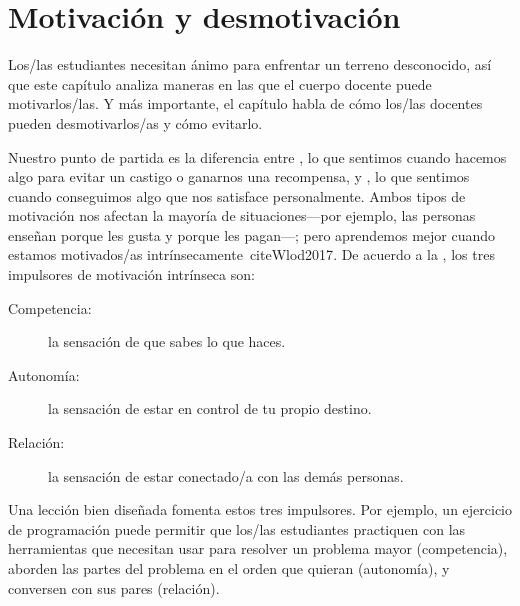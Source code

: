 \chapter{Motivación y desmotivación}\label{s:motivation}

Los/las estudiantes necesitan ánimo para enfrentar un terreno desconocido,
así que este capítulo analiza maneras en las que el cuerpo docente puede motivarlos/las.
Y más importante,
el capítulo habla de cómo los/las docentes pueden desmotivarlos/as
y cómo evitarlo.

Nuestro punto de partida es la diferencia entre
,
lo que sentimos cuando hacemos algo para evitar un castigo o ganarnos una recompensa,
y ,
lo que sentimos cuando conseguimos algo que nos satisface personalmente.
Ambos tipos de motivación nos afectan la mayoría de situaciones---por ejemplo,
las personas enseñan porque les gusta y porque les pagan---; pero
aprendemos mejor cuando estamos motivados/as intrínsecamente~cite{Wlod2017}.
De acuerdo a la 
,
los tres impulsores de motivación intrínseca son:

\begin{description}

\item[Competencia:]
  la sensación de que sabes lo que haces. 

\item[Autonomía:]
  la sensación de estar en control de tu propio destino.

\item[Relación:]
  la sensación de estar conectado/a con las demás personas.

\end{description}

Una lección bien diseñada fomenta estos tres impulsores.
Por ejemplo,
un ejercicio de programación puede permitir que los/las estudiantes
practiquen con las herramientas que necesitan usar para resolver un problema mayor (competencia),
aborden las partes del problema en el orden que quieran (autonomía),
y conversen con sus pares (relación).

